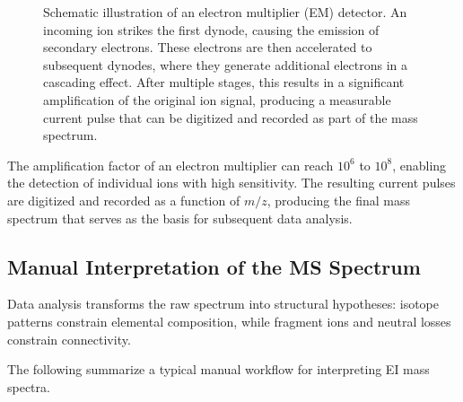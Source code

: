 \begin{figure}[H]
    \centering
    \resizebox{0.9\textwidth}{!}{}
    \caption[Schematic of an electron multiplier detector]{
        Schematic illustration of an electron multiplier (EM) detector.
        An incoming ion strikes the first dynode, causing the emission of secondary electrons.
        These electrons are then accelerated to subsequent dynodes, where they generate additional electrons in a cascading effect.
        After multiple stages, this results in a significant amplification of the original ion signal, producing a measurable current pulse that can be digitized and recorded as part of the mass spectrum.
    }
    \label{fig:em-schematic}
    \cite[p.~50]{Rockwood2018}
\end{figure}

The amplification factor of an electron multiplier can reach $10^6$ to $10^8$, enabling the detection of individual ions with high sensitivity.
The resulting current pulses are digitized and recorded as a function of $m/z$, producing the final mass spectrum that serves as the basis for subsequent data analysis. \cite[p.~104]{Dass2007}

\subsection{Manual Interpretation of the MS Spectrum}

Data analysis transforms the raw spectrum into structural hypotheses: isotope patterns constrain elemental composition, \cite[p.~67]{Gross2006} while fragment ions and neutral losses constrain connectivity. \cite{Bourcier2008}

The following summarize a typical manual workflow \cite[pp.~215-216]{Dass2007} for interpreting EI mass spectra.

